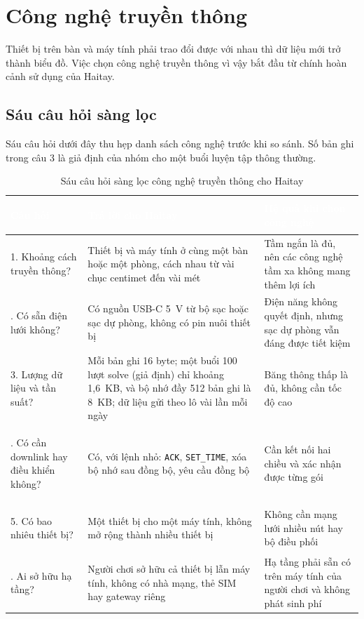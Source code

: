 \setcounter{section}{3}
\section{Công nghệ truyền thông}
Thiết bị trên bàn và máy tính phải trao đổi được với nhau thì dữ liệu mới trở thành biểu đồ. Việc chọn công nghệ truyền thông vì vậy bắt đầu từ chính hoàn cảnh sử dụng của Haitay.

\subsection{Sáu câu hỏi sàng lọc}
Sáu câu hỏi dưới đây thu hẹp danh sách công nghệ trước khi so sánh. Số bản ghi trong câu 3 là giả định của nhóm cho một buổi luyện tập thông thường.

\begin{table}[H]
    \centering
    \renewcommand{\arraystretch}{1.5}
    \caption{Sáu câu hỏi sàng lọc công nghệ truyền thông cho Haitay}
    \label{tab:screening}
    \begin{tabular}{>{\bfseries\raggedright\arraybackslash}m{3.3cm} >{\raggedright\arraybackslash}m{5.8cm} >{\raggedright\arraybackslash}m{5.1cm}}
        \toprule
        \rowcolor{haitayblue}
        \textcolor{white}{Câu hỏi} & \textcolor{white}{Trả lời cho Haitay} & \textcolor{white}{Hệ quả khi chọn công nghệ} \\
        \midrule
        \rowcolor{haitayblue!8}
        1. Khoảng cách truyền thông? & Thiết bị và máy tính ở cùng một bàn hoặc một phòng, cách nhau từ vài chục centimet đến vài mét & Tầm ngắn là đủ, nên các công nghệ tầm xa không mang thêm lợi ích \\
        2. Có sẵn điện lưới không? & Có nguồn USB-C 5~V từ bộ sạc hoặc sạc dự phòng, không có pin nuôi thiết bị & Điện năng không quyết định, nhưng sạc dự phòng vẫn đáng được tiết kiệm \\
        \rowcolor{haitayblue!8}
        3. Lượng dữ liệu và tần suất? & Mỗi bản ghi 16 byte; một buổi 100 lượt solve (giả định) chỉ khoảng 1,6~KB, và bộ nhớ đầy 512 bản ghi là 8~KB; dữ liệu gửi theo lô vài lần mỗi ngày & Băng thông thấp là đủ, không cần tốc độ cao \\
        4. Có cần downlink hay điều khiển không? & Có, với lệnh nhỏ: \texttt{ACK}, \texttt{SET\_TIME}, xóa bộ nhớ sau đồng bộ, yêu cầu đồng bộ & Cần kết nối hai chiều và xác nhận được từng gói \\
        \rowcolor{haitayblue!8}
        5. Có bao nhiêu thiết bị? & Một thiết bị cho một máy tính, không mở rộng thành nhiều thiết bị & Không cần mạng lưới nhiều nút hay bộ điều phối \\
        6. Ai sở hữu hạ tầng? & Người chơi sở hữu cả thiết bị lẫn máy tính, không có nhà mạng, thẻ SIM hay gateway riêng & Hạ tầng phải sẵn có trên máy tính của người chơi và không phát sinh phí \\
        \bottomrule
    \end{tabular}
\end{table}

